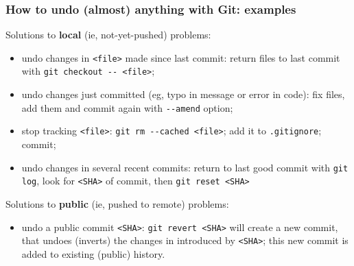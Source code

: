 \documentclass[10pt,svgnames,handout]{beamer}
\begin{document}
\begin{frame}
\frametitle{How to undo (almost) anything with Git: examples}
Solutions to \textbf{local} (ie, not-yet-pushed) problems:
\begin{itemize}[<+->]
  \item undo changes in \lstinline{<file>} made since last commit: return files to last commit with \lstinline{git checkout -- <file>};
  \item undo changes just committed (eg, typo in message or error in code): fix files, add them and commit again with \lstinline{--amend} option;
  \item stop tracking \lstinline{<file>}: \lstinline{git rm --cached <file>}; add it to \lstinline{.gitignore}; commit;
  \item undo changes in several recent commits: return to last good commit with \lstinline{git log}, look for \lstinline{<SHA>} of commit, then \lstinline{git reset <SHA>}
\end{itemize}
\medskip
\pause
Solutions to \textbf{public} (ie, pushed to remote) problems:
\begin{itemize}
  \item undo a public commit \lstinline{<SHA>}: \lstinline{git revert <SHA>} will create a new commit, that undoes (inverts) the changes in introduced by \lstinline{<SHA>}; this new commit is added to existing (public) history.
\end{itemize}

\end{frame}
\end{document}
